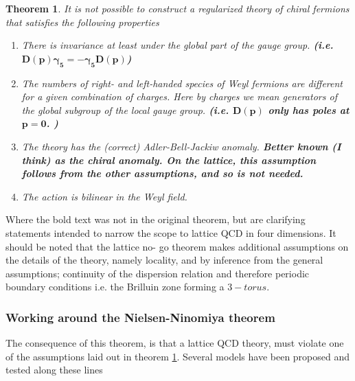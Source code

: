 \documentclass[a4paper,10pt]{article}
\newtheorem{theorem}{Theorem}
\begin{document}
\begin{theorem}\label{theorem:asas}
It is not possible to construct a regularized theory of chiral fermions that satisfies the following properties
\begin{enumerate}
\item There is invariance at least under the global
part of the gauge group. \textbf{(i.e. $\mathbf{D(p)\gamma_5 = -\gamma_5D(p)}$)}
\item The numbers of right- and left-handed species
of Weyl fermions are different for a given combination of charges. Here by charges we mean generators of the global subgroup of the local gauge group. \textbf{(i.e. $\mathbf{D(p)}$ only has poles at $\mathbf{p=0}$. )}
\item The theory has the (correct) Adler-Bell-Jackiw
anomaly. \textbf{Better known (I think) as the chiral anomaly. On the lattice, this assumption follows from the other assumptions, and so is not needed.}
\item The action is bilinear in the Weyl field. 

\end{enumerate}
\end{theorem}
Where the bold text was not in the original theorem, but are clarifying statements intended to narrow the scope to lattice QCD in four dimensions. It should be noted that the lattice no- go theorem makes additional assumptions on the details of the theory, namely locality, and by inference from the general assumptions; continuity of the dispersion relation and therefore periodic boundary conditions i.e. the Brilluin zone forming a $3- torus$\cite{NielsenH.B1981Antf}.
\subsubsection{Working around the Nielsen-Ninomiya theorem}\label{Chiral_fermions}
The  consequence of this theorem, is that a lattice QCD theory, must violate one of the assumptions laid out in theorem \ref{theorem:asas}. Several models have been proposed and tested along these lines
\end{document}
